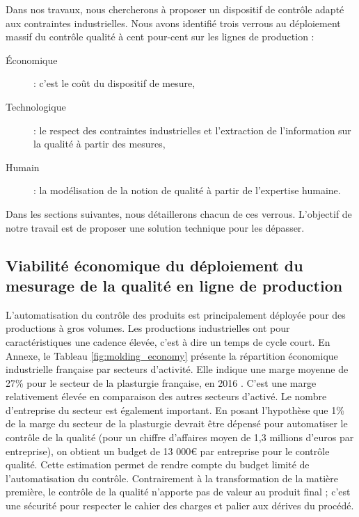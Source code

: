 Dans nos travaux, nous chercherons à proposer un dispositif de contrôle adapté aux contraintes industrielles.
Nous avons identifié trois verrous au déploiement massif du contrôle qualité à cent pour-cent sur les lignes de production :
\begin{description}
	\item[Économique] : c’est le coût du dispositif de mesure,
	\item[Technologique] : le respect des contraintes industrielles et l'extraction de l'information sur la qualité à partir des mesures,
	\item[Humain] : la modélisation de la notion de qualité à partir de l'expertise humaine.
\end{description}
Dans les sections suivantes, nous détaillerons chacun de ces verrous.
L'objectif de notre travail est de proposer une solution technique pour les dépasser.

\subsection{Viabilité économique du déploiement du mesurage de la qualité en ligne de production}

L'automatisation du contrôle des produits est principalement déployée pour des productions à gros volumes.
Les productions industrielles ont pour caractéristiques une cadence élevée, c'est à dire un temps de cycle court.  %
En Annexe, le Tableau \ref{fig:molding_economy} présente la répartition économique industrielle française par secteurs d'activité.
Elle indique une marge moyenne de 27\% pour le secteur de la plasturgie française, en 2016 \cite{directiongeneraledesentreprises_chiffres_2019}.
C'est une marge relativement élevée en comparaison des autres secteurs d'activé.
Le nombre d'entreprise du secteur est également important.
En posant l'hypothèse que 1\% de la marge du secteur de la plasturgie devrait être dépensé pour automatiser le contrôle de la qualité (pour un chiffre d'affaires moyen de 1,3 millions d'euros par entreprise), on obtient un budget de 13 000€ par entreprise pour le contrôle qualité.
Cette estimation permet de rendre compte du budget limité de l'automatisation du contrôle.
Contrairement à la transformation de la matière première, le contrôle de la qualité n'apporte pas de valeur au produit final ; c'est une sécurité pour respecter le cahier des charges et palier aux dérives du procédé.

